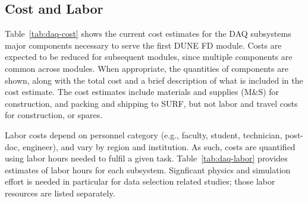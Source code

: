 \subsection{Cost and Labor}
\label{sec:sp-daq:cost}



Table~\ref{tab:daq-cost} shows the current cost estimates for the DAQ
subsystems major components necessary to serve the first DUNE FD
module. Costs are expected to be reduced for subsequent modules, since
multiple components are common across modules. When appropriate, the quantities of
components are shown, along with the total cost and a brief description of
what is included in the cost estimate. The cost estimates include
materials and supplies (M\&S) for construction, and packing and
shipping to SURF, but not labor and travel costs for construction, or
spares. 

Labor costs depend on personnel category (e.g., faculty, student,
technician, post-doc, engineer), and vary by region and
institution. As such, costs are quantified using labor hours needed to
fulfil a given task. Table~\ref{tab:daq-labor} provides estimates of
labor hours for each subsystem. Signficant physics and simulation
effort is needed in particular for data selection related studies; those
labor resources are listed separately.

